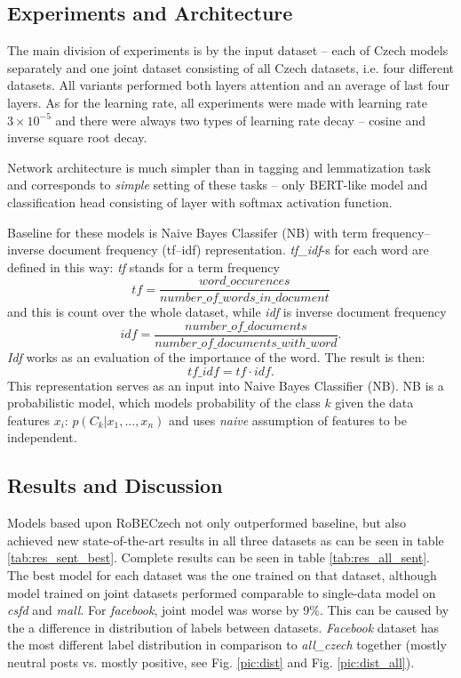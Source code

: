 \subsection{Experiments and Architecture}
The main division of experiments is by the input dataset -- each of Czech models separately and one joint dataset consisting of all Czech datasets, i.e. four different datasets. All variants performed both layers attention and an average of last four layers. As for the learning rate, all experiments were made with learning rate $3 \times 10^{-5}$ and there were always two types of learning rate decay -- cosine and inverse square root decay. 
\par
Network architecture is much simpler than in tagging and lemmatization task and corresponds to \textit{simple} setting of these tasks -- only BERT-like model and classification head consisting of layer with softmax activation function. 
\par 
Baseline for these models is Naive Bayes Classifer (NB) with term frequency--inverse document frequency (tf--idf) representation. \textit{tf\_idf}-s for each word are defined in this way: \textit{tf} stands for a term frequency
\[ tf = \frac{word\_occurences}{number\_of\_words\_in\_document} \]
and this is count over the whole dataset, while \textit{idf} is inverse document frequency
\[idf = \frac{number\_of\_documents}{number\_of\_documents\_with\_word}.\]\textit{Idf} works as an evaluation of the importance of the word. The result is then: \[tf\_idf = tf \cdot idf .\] 
This representation serves as an input into Naive Bayes Classifier (NB). NB \citep{duda1973pattern} is a probabilistic model, which models probability of the class $k$ given the data features $x_i$: $p(C_k|x_1,...,x_n)$ and uses \textit{naive} assumption of features to be independent. 

\subsection{Results and Discussion}
Models based upon RoBECzech not only outperformed baseline, but also achieved new state-of-the-art results in all three datasets as can be seen in table \ref{tab:res_sent_best}. Complete results can be seen in table \ref{tab:res_all_sent}. The best model for each dataset was the one trained on that dataset, although model trained on joint datasets performed comparable to single-data model on \textit{csfd} and \textit{mall}. For \textit{facebook}, joint model was worse by 9\%. This can be caused by the a difference in distribution of labels between datasets. \textit{Facebook} dataset has the most different label distribution in comparison to \textit{all\_czech} together (mostly neutral posts vs. mostly positive, see Fig. \ref{pic:dist} and Fig. \ref{pic:dist_all}). 

